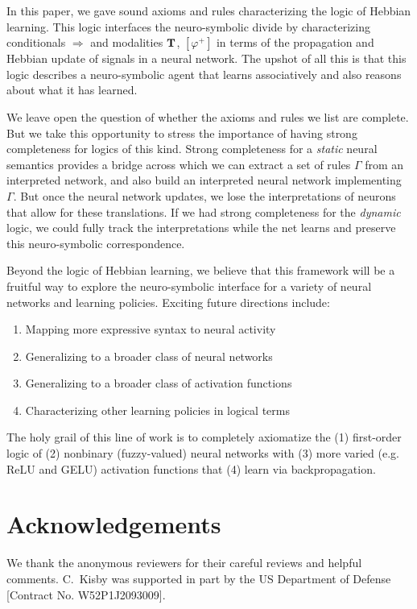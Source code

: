 \documentclass[letterpaper]{article}
\theoremstyle{definition}
\newcommand{\Typ}{\textrm{\textup{\textbf{T}}}}
\begin{document}
In this paper, we gave sound axioms and rules characterizing the logic of Hebbian learning.  This logic interfaces the neuro-symbolic divide by characterizing conditionals $\Rightarrow$ and modalities $\Typ$, $[\varphi^+]$ in terms of the propagation and Hebbian update of signals in a neural network.  The upshot of all this is that this logic describes a neuro-symbolic agent that learns associatively and also reasons about what it has learned.

We leave open the question of whether the axioms and rules we list are complete.  But we take this opportunity to stress the importance of having strong completeness for logics of this kind.  Strong completeness for a \emph{static} neural semantics provides a bridge across which we can extract a set of rules $\Gamma$ from an interpreted network, and also build an interpreted neural network implementing $\Gamma$.  But once the neural network updates, we lose the interpretations of neurons that allow for these translations.  If we had strong completeness for the \emph{dynamic} logic, we could fully track the interpretations while the net learns and preserve this neuro-symbolic correspondence.

Beyond the logic of Hebbian learning, we believe that this framework will be a fruitful way to explore the neuro-symbolic interface for a variety of neural networks and learning policies.  Exciting future directions include:
\begin{enumerate}[itemsep=-1pt, topsep=2pt]
    \item Mapping more expressive syntax to neural activity
    \item Generalizing to a broader class of neural networks
    \item Generalizing to a broader class of activation functions
    \item Characterizing other learning policies in logical terms
\end{enumerate}
The holy grail of this line of work is to completely axiomatize the (1) first-order logic of (2) nonbinary (fuzzy-valued) neural networks with (3) more varied (e.g. ReLU and GELU) activation functions that (4) learn via backpropagation.

\section{Acknowledgements}
We thank the anonymous reviewers for their careful reviews and helpful comments.  C.~Kisby was supported in part by the US Department of Defense [Contract No. W52P1J2093009].



\end{document}
